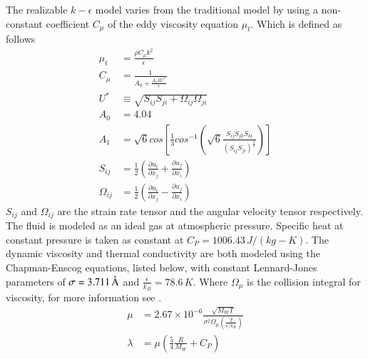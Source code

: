 \documentclass[preprint,12pt]{elsarticle}
\begin{document}
The realizable $k-\epsilon$ model varies from the traditional model by using a non-constant coefficient $C_\mu$ of the eddy viscosity equation $\mu_t$.  Which is defined as follows \cite{fluent,realizable}
%
\begin{subequations}
\begin{align}
\mu_t &= \frac{\rho C_{\mu} k^2}{\epsilon} \\
C_{\mu} &= \frac{1}{A_0 + \frac{A_1 k U^*}{\epsilon}} \\
U^* &\equiv \sqrt{S_{ij} S_{ji} + \Omega_{ij} \Omega_{ji}} \\
A_0 &= 4.04 \\
A_1 &= \sqrt{6} cos \left[\frac{1}{3} cos^{-1}\left(\sqrt{6} \frac{S_{ij}S_{jk}S_{ki}}{\left(S_{ij} S_{ji} \right)^{\frac{3}{2}}} \right) \right] \\
S_{ij} &= \frac{1}{2} \left( \frac{\partial u_i}{\partial x_j} + \frac{\partial u_j}{\partial x_i} \right) \\
\Omega_{ij} &= \frac{1}{2} \left( \frac{\partial u_i}{\partial x_j} - \frac{\partial u_j}{\partial x_i} \right)
\end{align}
\end{subequations}
%
$S_{ij}$ and $\Omega_{ij}$ are the strain rate tensor and the angular velocity tensor respectively.  The fluid is modeled as an ideal gas at atmospheric pressure.  Specific heat at constant pressure is taken as constant at $C_P=1006.43\, J/(kg-K)$.  The dynamic viscosity and thermal conductivity are both modeled using the Chapman-Enscog equations, listed below, with constant Lennard-Jones parameters of $\sigma = 3.711\,\textup{\AA}$ and $\frac{\epsilon}{k_B} = 78.6\, K$.  Where $\Omega_{\mu}$ is the collision integral for viscosity, for more information see \citet{vincenti,fluent}.
\begin{subequations}
\begin{align}
\mu &= 2.67 \times 10^{-6} \frac{\sqrt{M_W T}}{\sigma^2 \Omega_{\mu} \left(\frac{T}{\epsilon/k_B} \right)} \\
\lambda &= \mu \left(\frac{5}{4} \frac{R}{M_W} +C_P \right)
\end{align}
\end{subequations}
\end{document}
